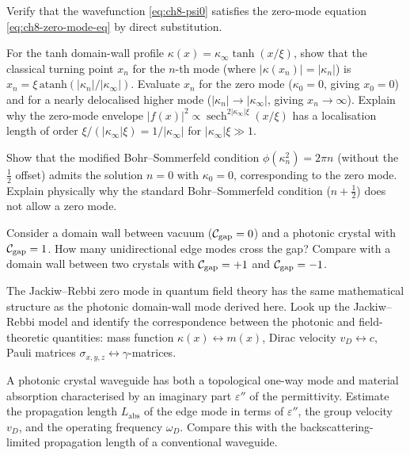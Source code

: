 \begin{exercise}
  Verify that the wavefunction \eqref{eq:ch8-psi0} satisfies the
  zero-mode equation \eqref{eq:ch8-zero-mode-eq} by direct
  substitution.
\end{exercise}

\begin{exercise}
  For the tanh domain-wall profile $\kappa(x)=\kappa_\infty\tanh(x/\xi)$,
  show that the classical turning point $x_n$ for the $n$-th mode
  (where $|\kappa(x_n)|=|\kappa_n|$) is
  $x_n=\xi\,\mathrm{atanh}(|\kappa_n|/|\kappa_\infty|)$.
  Evaluate $x_n$ for the zero mode ($\kappa_0=0$, giving $x_0=0$)
  and for a nearly delocalised higher mode ($|\kappa_n|\to|\kappa_\infty|$,
  giving $x_n\to\infty$).  Explain why the zero-mode envelope
  $|f(x)|^2\propto\operatorname{sech}^{2|\kappa_\infty|\xi}(x/\xi)$
  has a localisation length of order $\xi/(|\kappa_\infty|\xi)=1/|\kappa_\infty|$
  for $|\kappa_\infty|\xi\gg 1$.
\end{exercise}

\begin{exercise}
  Show that the modified Bohr--Sommerfeld condition
  $\phi(\kappa_n^2)=2\pi n$ (without the $\frac{1}{2}$ offset) admits
  the solution $n=0$ with $\kappa_0=0$, corresponding to the zero mode.
  Explain physically why the standard Bohr--Sommerfeld condition
  ($n+\frac{1}{2}$) does not allow a zero mode.
\end{exercise}

\begin{exercise}
  Consider a domain wall between vacuum ($\mathcal{C}_{\mathrm{gap}}=0$) and
  a photonic crystal with $\mathcal{C}_{\mathrm{gap}}=1$.  How many
  unidirectional edge modes cross the gap?  Compare with a domain wall
  between two crystals with $\mathcal{C}_{\mathrm{gap}}=+1$ and
  $\mathcal{C}_{\mathrm{gap}}=-1$.
\end{exercise}

\begin{exercise}
  The Jackiw--Rebbi zero mode in quantum field theory has the same
  mathematical structure as the photonic domain-wall mode derived here.
  Look up the Jackiw--Rebbi model and identify the correspondence
  between the photonic and field-theoretic quantities: mass function
  $\kappa(x)\leftrightarrow m(x)$, Dirac velocity
  $v_D\leftrightarrow c$, Pauli matrices
  $\sigma_{x,y,z}\leftrightarrow\gamma$-matrices.
\end{exercise}

\begin{exercise}
  A photonic crystal waveguide has both a topological one-way mode and
  material absorption characterised by an imaginary part
  $\varepsilon''$ of the permittivity.  Estimate the propagation length
  $L_{\mathrm{abs}}$ of the edge mode in terms of $\varepsilon''$, the
  group velocity $v_D$, and the operating frequency $\omega_D$.
  Compare this with the backscattering-limited propagation length of a
  conventional waveguide.
\end{exercise}
